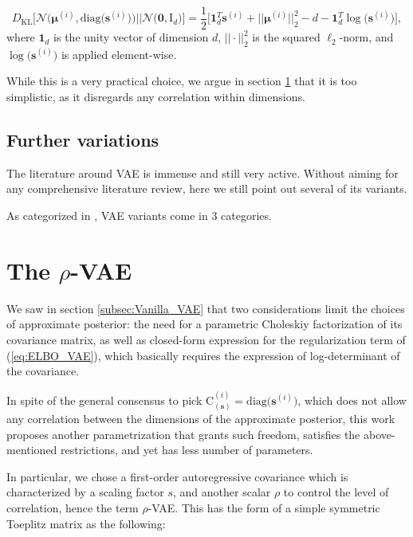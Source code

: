 \documentclass{article}
\begin{document}
\begin{equation}  \label{eq:vae_KLD_loss}
D_{\text{KL}}\Big[ \mathcal{N} \Big( \boldsymbol{\mu}^{(i)}, \text{diag} \big( \mathbf{s}^{(i)} \big) \Big)    \Big|\Big|  \mathcal{N} \big( \mathbf{0}, \mathrm{I}_d \big)  \Big] = \frac{1}{2} \Big[ \mathbf{1}_d^T \mathbf{s}^{(i)} + \big|\big| \boldsymbol{\mu}^{(i)} \big|\big|_2^2 -d -  \mathbf{1}_d^T \log \big({\mathbf{s}^{(i)}} \big) \Big], 
\end{equation}
where $\mathbf{1}_d$ is the unity vector of dimension $d$, $||\cdot||_2^2$ is the squared $\ell_2$-norm, and $\log \big({\mathbf{s}^{(i)}} \big)$ is applied element-wise.

While this is a very practical choice, we argue in section \ref{sec:proposed} that it is too simplistic, as it disregards any correlation within dimensions.


\subsection{Further variations} \label{subsec:SOTA}
The literature around VAE is immense and still very active. Without aiming for any comprehensive literature review, here we still point out several of its variants.

As categorized in \cite{tschannen2018recent}, VAE variants come in 3 categories.
 
\section{The $\rho$-VAE}  \label{sec:proposed}
We saw in section \ref{subsec:Vanilla_VAE} that two considerations limit the choices of approximate posterior: the need for a parametric Choleskiy factorization of its covariance matrix, as well as closed-form expression for the regularization term of (\eqref{eq:ELBO_VAE}), which basically requires the expression of log-determinant  of the covariance.

In spite of the general consensus to pick $\mathrm{C}_{(\mathbf{s})}^{(i)} = \text{diag}\big( \mathbf{s}^{(i)} \big)$, which does not allow any correlation between the dimensions of the approximate posterior, this work proposes another parametrization that grants such freedom, satisfies the above-mentioned restrictions, and yet has less number of parameters.

In particular, we chose a first-order autoregressive covariance which is characterized by a scaling factor $s$, and another scalar $\rho$ to control the level of correlation, hence the term $\rho$-VAE. This has the form of a simple symmetric Toeplitz matrix as the following:
\end{document}
